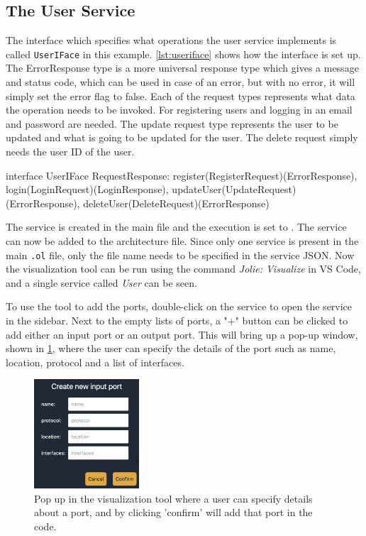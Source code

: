 \subsection{The User Service}
The interface which specifies what operations the user service implements is called \texttt{UserIFace} in this example.
\cref{lst:useriface} shows how the interface is set up. The ErrorResponse type is a more universal response type which gives a message and status code, which can be used in case of an error, but with no error, it will simply set the error flag to false.
Each of the request types represents what data the operation needs to be invoked. For registering users and logging in an email and password are needed. The update request type represents the user to be updated and what is going to be updated for the user. The delete request simply needs the user ID of the user.

\begin{jolisting}[][caption={The interface for the user service}, label={lst:useriface}]
interface UserIFace {
    RequestResponse:
        register(RegisterRequest)(ErrorResponse),
        login(LoginRequest)(LoginResponse),
        updateUser(UpdateRequest)(ErrorResponse),
        deleteUser(DeleteRequest)(ErrorResponse)
}
\end{jolisting}

The service is created in the main file and the execution is set to .
The service can now be added to the architecture file. Since only one service is present in the main \texttt{.ol} file, only the file name needs to be specified in the service JSON.
Now the visualization tool can be run using the command \emph{Jolie: Visualize} in VS Code, and a single service called \emph{User} can be seen.

To use the tool to add the ports, double-click on the service to open the service in the sidebar. Next to the empty lists of ports, a "+" button can be clicked to add either an input port or an output port.
This will bring up a pop-up window, shown in \cref{figure:popup_create_inputport}, where the user can specify the details of the port such as name, location, protocol and a list of interfaces.
\begin{figure}[t]
    \center
    \includegraphics[width=0.35\textwidth]{figures/popup_create_inputport.png}
    \caption{Pop up in the visualization tool where a user can specify details about a port, and by clicking 'confirm' will add that port in the code.}
    \label{figure:popup_create_inputport}
\end{figure}

